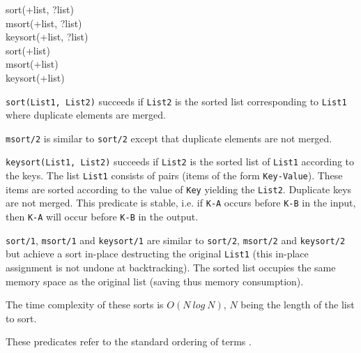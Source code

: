 \begin{TemplatesOneCol}
sort(+list, ?list)\\
msort(+list, ?list)\\
keysort(+list, ?list)\\
sort(+list)\\
msort(+list)\\
keysort(+list)

\end{TemplatesOneCol}

\Description

\texttt{sort(List1, List2)} succeeds if \texttt{List2} is the
sorted list corresponding to \texttt{List1} where duplicate elements are
merged.

\texttt{msort/2} is similar to \texttt{sort/2} except that duplicate elements
are not merged.

\texttt{keysort(List1, List2)} succeeds if \texttt{List2} is the
sorted list of \texttt{List1} according to the keys. The list \texttt{List1}
consists of pairs (items of the form \texttt{Key-Value}). These items are sorted
according to the value of \texttt{Key} yielding the \texttt{List2}. Duplicate
keys are not merged. This predicate is stable, i.e. if \texttt{K-A} occurs
before \texttt{K-B} in the input, then \texttt{K-A} will occur before
\texttt{K-B} in the output.

\texttt{sort/1}, \texttt{msort/1} and \texttt{keysort/1} are similar to
\texttt{sort/2}, \texttt{msort/2} and \texttt{keysort/2} but achieve a sort
in-place destructing the original \texttt{List1} (this in-place assignment is
not undone at backtracking). The sorted list occupies the same memory space
as the original list (saving thus memory consumption).

The time complexity of these sorts is $O(N~log~N)$, $N$ being the length of
the list to sort.

These predicates refer to the standard ordering of terms
.

\begin{PlErrors}







\end{PlErrors}

